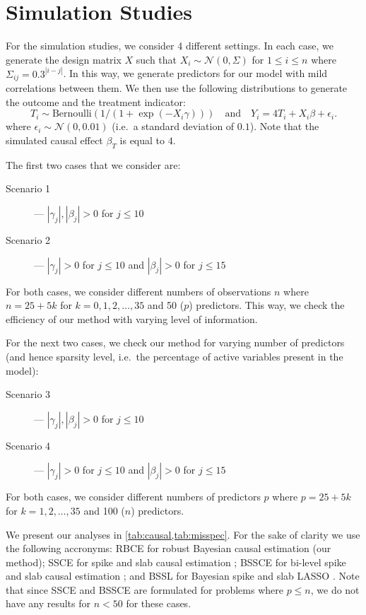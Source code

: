 \documentclass[preprint,12pt]{elsarticle}
\begin{document}
\section{Simulation Studies}\label{sec:sim}

For the simulation studies, we consider 4 different settings. In each
case, we generate the design matrix $X$ such that $X_i\sim\mathcal{N}(0, \Sigma)$
for $1\le i\le n$ where $\Sigma_{ij} = 0.3^{|i-j|}$. In this way, we 
generate predictors for our model with mild correlations between them.
We then use the following distributions to generate the outcome and
the treatment indicator: 
\begin{equation}
    T_i \sim \text{Bernoulli}\left(1/(1+\exp(-X_i\gamma))\right)
    \quad\text{and}\quad
    Y_i = 4T_i + X_i\beta + \epsilon_i.
\end{equation}
where $\epsilon_i\sim\mathcal{N}(0,0.01)$ (i.e.\ a standard deviation of $0.1$).
Note that the simulated causal effect $\beta_T$ is equal to $4$.

The first two cases that we consider are:
\begin{description}
    \item[Scenario 1] --- $|\gamma_j|, |\beta_j|>0$ for $j\le 10$
    \item[Scenario 2] --- $|\gamma_j|>0$ for $j\le 10$ and $|\beta_j|>0$ for $j\le 15$
\end{description}
For both
cases, we consider different numbers of observations $n$ where
$n=25+ 5k$ for $k=0,1,2,\dots,35$ and 50 ($p$)
predictors. This way, we check the efficiency of our method with varying level of information.

For the next two cases, we check our method for varying number of predictors (and hence sparsity level, i.e.\ the percentage of active variables present in the model):
\begin{description}
    \item[Scenario 3] --- $|\gamma_j|, |\beta_j|>0$ for $j\le 10$
    \item[Scenario 4] --- $|\gamma_j|>0$ for $j\le 10$ and $|\beta_j|>0$ for $j\le 15$
\end{description}
For both
cases, we consider different numbers of predictors $p$ where
$p=25+ 5k$ for $k=1,2,\dots,35$ and 100 ($n$)
predictors. 

We present our analyses in \cref{tab:causal,tab:misspec}.
For the sake of clarity we use the following accronyms: RBCE for 
robust Bayesian causal estimation (our method); SSCE for spike and
slab causal estimation \citep{koch2020}; BSSCE for bi-level spike and slab causal
estimation \citep{koch2020}; and BSSL for Bayesian spike and slab LASSO
\citep{xu2015}. Note that since SSCE and BSSCE are formulated for problems
where $p\le n$, we do not have any results for $n<50$ for these cases.
\end{document}
